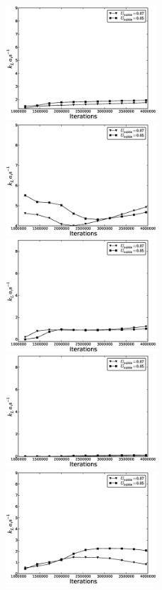 \documentclass{article}
\begin{document}
\begin{figure}[htb!]
\includegraphics[width=0.5\textwidth]{Figures/steady_quadro_overall.eps}
\includegraphics[width=0.5\textwidth]{Figures/steady_quadro_first.eps}\\
\includegraphics[width=0.5\textwidth]{Figures/steady_quadro_second.eps}
\includegraphics[width=0.5\textwidth]{Figures/steady_quadro_third.eps}\\
\includegraphics[width=0.5\textwidth]{Figures/steady_quadro_fourth.eps}\\

\end{figure}
\end{document}
